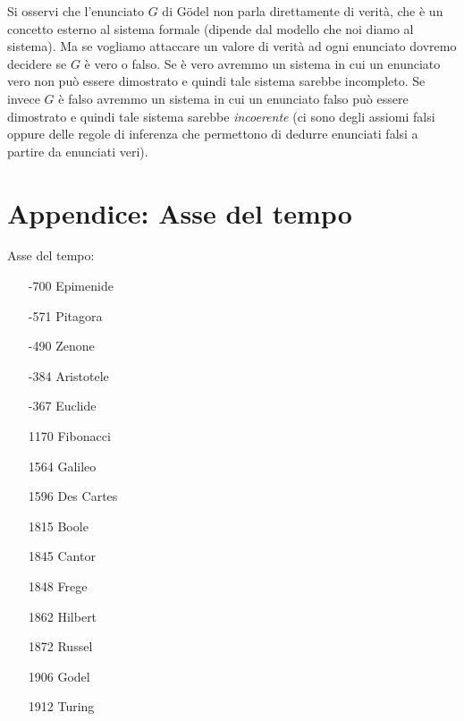 \documentclass[italian,a4paper,hidelinks]{scrartcl}
\newcommand{\myemph}[1]{\emph{#1}\marginpar{#1}}
\begin{document}
Si osservi che l'enunciato $G$ di G\"odel non parla direttamente di verità,
che è un concetto esterno al sistema formale
(dipende dal modello che noi diamo al sistema).
Ma se vogliamo attaccare un valore di verità ad ogni enunciato dovremo decidere
se $G$ è vero o falso. Se è vero avremmo un sistema in cui un enunciato vero
non può essere dimostrato e quindi tale sistema sarebbe incompleto.
Se invece $G$ è falso avremmo un sistema in cui un enunciato falso può essere
dimostrato e quindi tale sistema sarebbe \myemph{incoerente} (ci sono degli assiomi
falsi oppure delle regole di inferenza che permettono di dedurre enunciati falsi
a partire da enunciati veri).

\section{Appendice: Asse del tempo}
Asse del tempo:
\begin{itemize}
\item[-700] Epimenide
\item[-571] Pitagora
\item[-490] Zenone
\item[-384] Aristotele
\item[-367] Euclide
\item[1170] Fibonacci
\item[1564] Galileo
\item[1596] Des Cartes
\item[1815] Boole
\item[1845] Cantor
\item[1848] Frege
\item[1862] Hilbert
\item[1872] Russel
\item[1906] Godel
\item[1912] Turing
\end{itemize}
\end{document}
